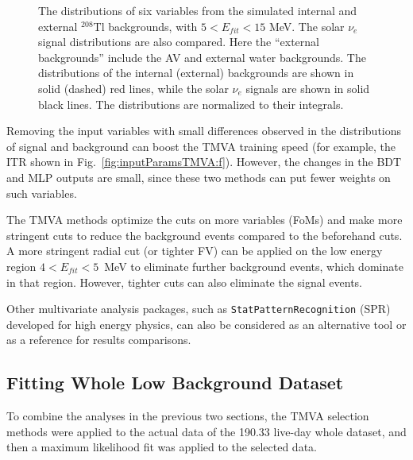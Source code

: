 \begin{figure}[htbp]
{\begin{minipage}[b]{0.4\textwidth}
	\end{minipage}
   }
	\caption[The distributions of six variables from the simulated internal and external $^{208}$Tl backgrounds.]{The distributions of six variables from the simulated internal and external $^{208}$Tl backgrounds, with $5<E_{fit}<15$ MeV. The solar $\nu_e$ signal distributions are also compared. Here the ``external backgrounds'' include the AV and external water backgrounds. The distributions of the internal (external) backgrounds are shown in solid (dashed) red lines, while the solar $\nu_e$ signals are shown in solid black lines. The distributions are normalized to their integrals.\label{fig:cmpExternalInternal}}
\end{figure}

Removing the input variables with small differences observed in the distributions of signal and background can boost the TMVA training speed (for example, the ITR shown in Fig.~\ref{fig:inputParamsTMVA:f}). However, the changes in the BDT and MLP outputs are small, since these two methods can put fewer weights on such variables.

The TMVA methods optimize the cuts on more variables (FoMs) and make more stringent cuts to reduce the background events compared to the beforehand cuts. A more stringent radial cut (or tighter FV) can be applied on the low energy region $4<E_{fit}<5$~MeV to eliminate further background events, which dominate in that region. However, tighter cuts can also eliminate the signal events.

Other multivariate analysis packages, such as \texttt{StatPatternRecognition} (SPR) \cite{sprWebsite} developed for high energy physics, can also be considered as an alternative tool or as a reference for results comparisons. 

\subsection{Fitting Whole Low Background Dataset}\label{sect:fitTheWhole}
To combine the analyses in the previous two sections, the TMVA selection methods were applied to the actual data of the 190.33 live-day whole dataset, and then a maximum likelihood fit was applied to the selected data. 

